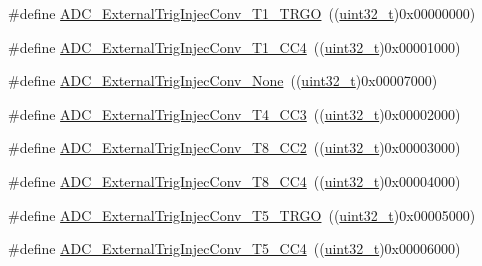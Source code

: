 \begin{DoxyCompactItemize}
\item 
\#define \hyperlink{group___a_d_c__external__trigger__sources__for__injected__channels__conversion_gabf47f66e60c166f6b63b805f72ad94b0}{A\+D\+C\+\_\+\+External\+Trig\+Injec\+Conv\+\_\+\+T1\+\_\+\+T\+R\+GO}~((\hyperlink{_p_e___types_8h_a33594304e786b158f3fb30289278f5af}{uint32\+\_\+t})0x00000000)
\item 
\#define \hyperlink{group___a_d_c__external__trigger__sources__for__injected__channels__conversion_gabd27bcc6ff5af6713a124b3801759bcf}{A\+D\+C\+\_\+\+External\+Trig\+Injec\+Conv\+\_\+\+T1\+\_\+\+C\+C4}~((\hyperlink{_p_e___types_8h_a33594304e786b158f3fb30289278f5af}{uint32\+\_\+t})0x00001000)
\item 
\#define \hyperlink{group___a_d_c__external__trigger__sources__for__injected__channels__conversion_gaad11a68fca76d97b97dc2554dac5cb16}{A\+D\+C\+\_\+\+External\+Trig\+Injec\+Conv\+\_\+\+None}~((\hyperlink{_p_e___types_8h_a33594304e786b158f3fb30289278f5af}{uint32\+\_\+t})0x00007000)
\item 
\#define \hyperlink{group___a_d_c__external__trigger__sources__for__injected__channels__conversion_gae342ca48595f0b2bf866943969026581}{A\+D\+C\+\_\+\+External\+Trig\+Injec\+Conv\+\_\+\+T4\+\_\+\+C\+C3}~((\hyperlink{_p_e___types_8h_a33594304e786b158f3fb30289278f5af}{uint32\+\_\+t})0x00002000)
\item 
\#define \hyperlink{group___a_d_c__external__trigger__sources__for__injected__channels__conversion_gac0320df9aa5e2d378b05f8e4dcc1616a}{A\+D\+C\+\_\+\+External\+Trig\+Injec\+Conv\+\_\+\+T8\+\_\+\+C\+C2}~((\hyperlink{_p_e___types_8h_a33594304e786b158f3fb30289278f5af}{uint32\+\_\+t})0x00003000)
\item 
\#define \hyperlink{group___a_d_c__external__trigger__sources__for__injected__channels__conversion_ga6724679fe75f87c029f268ef47841a3e}{A\+D\+C\+\_\+\+External\+Trig\+Injec\+Conv\+\_\+\+T8\+\_\+\+C\+C4}~((\hyperlink{_p_e___types_8h_a33594304e786b158f3fb30289278f5af}{uint32\+\_\+t})0x00004000)
\item 
\#define \hyperlink{group___a_d_c__external__trigger__sources__for__injected__channels__conversion_ga1d92236e9eb9f3adf69371f3f698192e}{A\+D\+C\+\_\+\+External\+Trig\+Injec\+Conv\+\_\+\+T5\+\_\+\+T\+R\+GO}~((\hyperlink{_p_e___types_8h_a33594304e786b158f3fb30289278f5af}{uint32\+\_\+t})0x00005000)
\item 
\#define \hyperlink{group___a_d_c__external__trigger__sources__for__injected__channels__conversion_gade68a960ba05714e5f0a1f11a086884e}{A\+D\+C\+\_\+\+External\+Trig\+Injec\+Conv\+\_\+\+T5\+\_\+\+C\+C4}~((\hyperlink{_p_e___types_8h_a33594304e786b158f3fb30289278f5af}{uint32\+\_\+t})0x00006000)

\end{DoxyCompactItemize}
